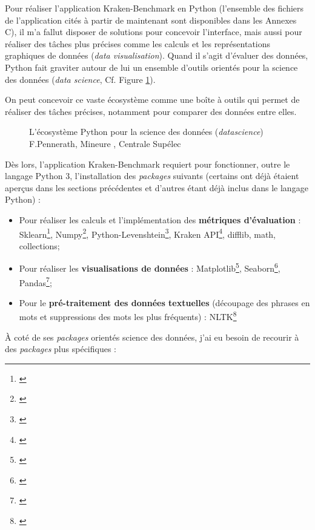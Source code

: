 Pour réaliser l'application Kraken-Benchmark en Python (l'ensemble des fichiers de l'application cités à partir de maintenant sont disponibles dans les Annexes C), il m'a fallut disposer de solutions pour concevoir l'interface, mais aussi pour réaliser des tâches plus précises comme les calculs et les représentations graphiques de données (\textit{data visualisation}). Quand il s'agit d'évaluer des données, Python fait graviter autour de lui un ensemble d'outils orientés pour la science des données (\textit{data science}, Cf. Figure \ref{fig:eco_datascience}).

On peut concevoir ce vaste écosystème comme une boîte à outils qui permet de réaliser des tâches précises, notamment pour comparer des données entre elles.  

\begin{figure}[h!]
    \centering
    \centerline{}
    \caption{L'écosystème Python pour la science des données (\textit{datascience})   \textcopyright F.Pennerath, Mineure , Centrale Supélec}
    \label{fig:eco_datascience}
\end{figure}

Dès lors, l'application Kraken-Benchmark requiert pour fonctionner, outre le langage Python 3, l'installation des \textit{packages} suivants (certains ont déjà étaient aperçus dans les sections précédentes et d'autres étant déjà inclus dans le langage Python) : 

\begin{itemize}
    \item Pour réaliser les calculs et l'implémentation des \textbf{métriques d'évaluation} : Sklearn\footnote{\cite{noauthor_scikit-learn_nodate}}, Numpy\footnote{\cite{noauthor_numpy_nodate}}, Python-Levenshtein\footnote{\cite{noauthor_python-levenshtein_nodate}}, Kraken API\footnote{\cite{noauthor_kraken_nodate}}, difflib, math, collections;
    \item Pour réaliser les \textbf{visualisations de données} : Matplotlib\footnote{\cite{noauthor_matplotlib_nodate}}, Seaborn\footnote{\cite{noauthor_seaborn_nodate}}, Pandas\footnote{\cite{noauthor_pandas_nodate}};
    \item Pour le \textbf{pré-traitement des données textuelles} (découpage des phrases en mots et suppressions des mots les plus fréquents) : NLTK\footnote{\cite{noauthor_nltk_nodate}}
\end{itemize}

À coté de ses \textit{packages} orientés science des données, j'ai eu besoin de recourir à des \textit{packages} plus spécifiques : 

